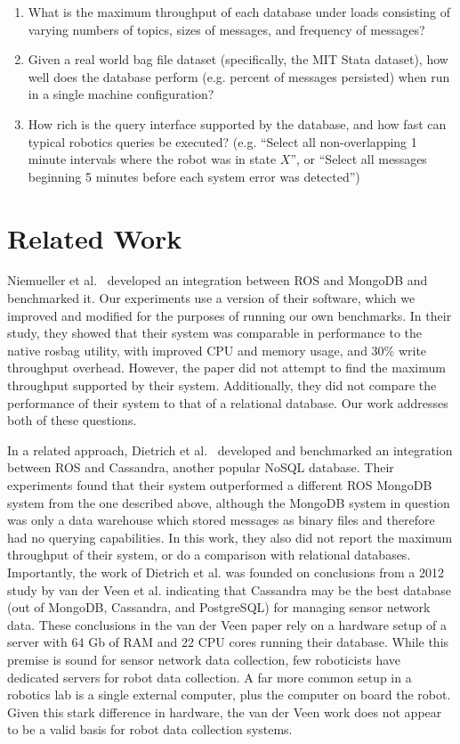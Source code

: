 \documentclass[nocopyrightspace]{acm_proc_article-sp}
\begin{document}
\begin{enumerate}
    \item What is the maximum throughput of each database under loads consisting of varying numbers of topics, sizes of messages, and frequency of messages? 
    \item Given a real world bag file dataset (specifically, the MIT Stata dataset), how well does the database perform (e.g. percent of messages persisted) when run in a single machine configuration?
    \item How rich is the query interface supported by the database, and how fast can typical robotics queries be executed? (e.g. ``Select all non-overlapping 1 minute intervals where the robot was in state $X$'', or ``Select all messages beginning 5 minutes before each system error was detected'')
\end{enumerate}

\section{Related Work}
Niemueller et al.~\cite{niemueller2012generic} developed an integration between ROS and MongoDB and benchmarked it. Our experiments use a version of their software, which we improved and modified for the purposes of running our own benchmarks. In their study, they showed that their system was comparable in performance to the native rosbag utility, with improved CPU and memory usage, and 30\% write throughput overhead. However, the paper did not attempt to find the maximum throughput supported by their system. Additionally, they did not compare the performance of their system to that of a relational database. Our work addresses both of these questions.

In a related approach, Dietrich et al.~\cite{dietrich2014ros} developed and benchmarked an integration between ROS and Cassandra, another popular NoSQL database. Their experiments found that their system outperformed a different ROS MongoDB system from the one described above, although the MongoDB system in question was only a data warehouse which stored messages as binary files and therefore had no querying capabilities. In this work, they also did not report the maximum throughput of their system, or do a comparison with relational databases. Importantly, the work of Dietrich et al. was founded on conclusions from a 2012 study by van der Veen et al. \cite{van2012sensor} indicating that Cassandra may be the best database (out of MongoDB, Cassandra, and PostgreSQL) for managing sensor network data. These conclusions in the van der Veen paper rely on a hardware setup of a server with 64 Gb of RAM and 22 CPU cores running their database. While this premise is sound for sensor network data collection, few roboticists have dedicated servers for robot data collection. A far more common setup in a robotics lab is a single external computer, plus the computer on board the robot. Given this stark difference in hardware, the van der Veen work does not appear to be a valid basis for robot data collection systems.
\end{document}
